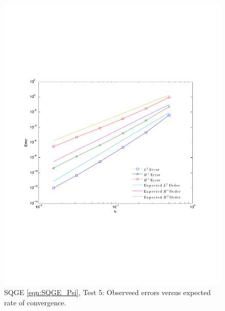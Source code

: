 \begin{figure}
  \begin{center}
    \includegraphics[scale=0.5]{Figures/SQGEsin2Convergence.pdf}
    \caption{SQGE \eqref{eqn:SQGE_Psi}, Test 5: Observeed errors versus expected
      rate of convergence.}
    \label{fig:SQGEsinErrors}
  \end{center}
\end{figure}

